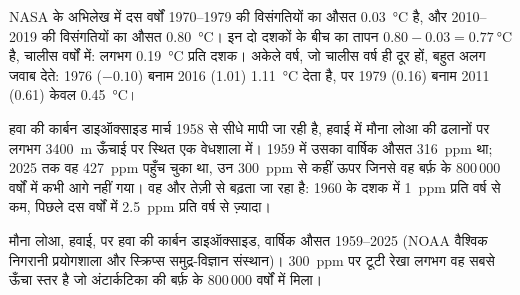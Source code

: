 \begin{example}[1970 के दशक से तापन]
NASA के अभिलेख में दस वर्षों 1970--1979 की विसंगतियों का औसत \qty{0.03}{\degreeCelsius}
है, और 2010--2019 की विसंगतियों का औसत \qty{0.80}{\degreeCelsius}। इन दो दशकों के बीच
का तापन $0.80 - 0.03 = \qty{0.77}{\degreeCelsius}$ है, चालीस वर्षों में: लगभग
\qty{0.19}{\degreeCelsius} प्रति दशक। अकेले वर्ष, जो चालीस वर्ष ही दूर हों, बहुत अलग
जवाब देते: 1976 ($-0.10$) बनाम 2016 (1.01) \qty{1.11}{\degreeCelsius} देता है, पर
1979 (0.16) बनाम 2011 (0.61) केवल
\qty{0.45}{\degreeCelsius}।
\end{example}

हवा की कार्बन डाइऑक्साइड मार्च 1958 से सीधे मापी जा रही है, हवाई में मौना लोआ 
की ढलानों पर लगभग \qty{3400}{m} ऊँचाई पर स्थित एक वेधशाला में। 1959 में उसका वार्षिक
औसत \qty{316}{ppm} था; 2025 तक वह \qty{427}{ppm} पहुँच चुका था, उन \qty{300}{ppm}
से कहीं ऊपर जिनसे वह बर्फ़ के 800\,000 वर्षों में कभी आगे नहीं गया। वह और तेज़ी से बढ़ता
जा रहा है: 1960 के दशक में \qty{1}{ppm} प्रति वर्ष से कम, पिछले दस वर्षों में
\qty{2.5}{ppm} प्रति वर्ष से
ज़्यादा।

\begin{omfigure}

{\small मौना लोआ, हवाई, पर हवा की कार्बन डाइऑक्साइड, वार्षिक औसत 1959--2025 (NOAA
वैश्विक निगरानी प्रयोगशाला और स्क्रिप्स समुद्र-विज्ञान संस्थान)। \qty{300}{ppm} पर टूटी
रेखा लगभग वह सबसे ऊँचा स्तर है जो अंटार्कटिका की बर्फ़ के 800\,000 वर्षों में
मिला।}
\label{fig:g9:climate-past-and-present:co2}
\end{omfigure}

